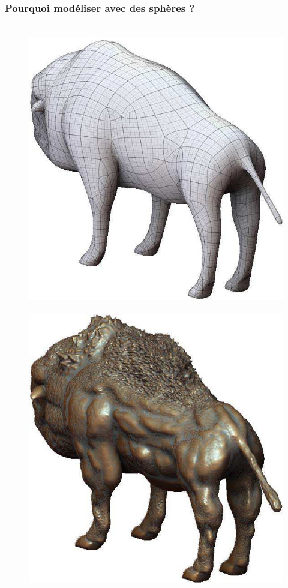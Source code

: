 \documentclass[10pt]{beamer}
\begin{document}
\begin{frame}
	\frametitle{Pourquoi modéliser avec des sphères ?}
	\begin{figure}[H]
		\centering
		\leavevmode
  		\hbox{
  			\includegraphics[scale=0.2]{images/basemesh.jpg}
  			\hspace*{0.5cm} 
     		\includegraphics[scale=0.2]{images/detailedmesh.jpg}
     		\hspace*{0.5cm}  
  		}
	\end{figure}
\end{frame}
\end{document}
